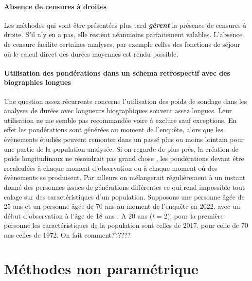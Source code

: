 \documentclass[
  12pt,
  letterpaper,
  DIV=11,
  numbers=noendperiod,
  onepage,
  openany]{scrreprt}
\begin{document}
\hypertarget{absence-de-censures-uxe0-droites}{%
\subsection{Absence de censures à
droites}\label{absence-de-censures-uxe0-droites}}

Les méthodes qui vont être présentées plus tard \textbf{\emph{gèrent}}
la présence de censures à droite. S'il n'y en a pas, elle restent
néanmoins parfaitement valables. L'absence de censure facilite certaines
analyses, par exemple celles des fonctions de séjour où le calcul direct
des durées moyennes est rendu possible.

\hypertarget{utilisation-des-ponduxe9rations-dans-un-schema-retrospectif-avec-des-biographies-longues}{%
\subsection{Utilisation des pondérations dans un schema retrospectif
avec des biographies
longues}\label{utilisation-des-ponduxe9rations-dans-un-schema-retrospectif-avec-des-biographies-longues}}

Une question assez récurrente concerne l'utilisation des poids de
sondage dans les analyses de durées avec longueurs biographiques souvent
assez longues. Leur utilisation ne me semble pas recommandée voire à
exclure sauf exceptions. En effet les pondérations sont générées au
moment de l'enquête, alors que les évènements étudiés peuvent remonter
dans un passé plus ou moins lointain pour une partie de la population
analysée. Si on regarde de plus près, la création de poids longitudinaux
ne résoudrait pas grand chose , les pondérations devant être recalculées
à chaque moment d'observation ou à chaque moment où des évènements se
produisent. Par ailleurs on mélangerait régulièrement à un instant donné
des personnes issues de générations différentes ce qui rend impossible
tout calage sur des caractéristiques d'un population. Supposons une
personne âgée de 25 ans et un personne âgée de 70 ans au moment de
l'enquête en 2022, avec un début d'observation à l'âge de 18 ans . A 20
ans (\(t=2\)), pour la première personne les caractéristiques de la
population sont celles de 2017, pour celle de 70 ans celles de 1972. On
fait comment??????

\part{Méthodes non paramétrique}
\end{document}

